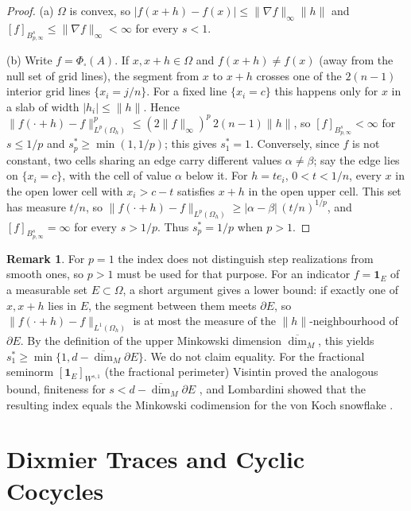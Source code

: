 \documentclass[11pt,a4paper,reqno]{amsart}
\theoremstyle{definition}
\newtheorem{remark}[theorem]{Remark}
\numberwithin{equation}{section}
\begin{document}
\begin{proof}
(a) $\Omega$ is convex, so $|f(x+h) - f(x)| \le \|\nabla f\|_\infty \|h\|$ and $[f]_{B^s_{p,\infty}} \le \|\nabla f\|_\infty < \infty$ for every $s < 1$.

(b) Write $f = \Phi_\square(A)$. If $x, x + h \in \Omega$ and $f(x+h) \ne f(x)$ (away from the null set of grid lines), the segment from $x$ to $x+h$ crosses one of the $2(n-1)$ interior grid lines $\{x_i = j/n\}$. For a fixed line $\{x_i = c\}$ this happens only for $x$ in a slab of width $|h_i| \le \|h\|$. Hence $\|f(\cdot + h) - f\|_{L^p(\Omega_h)}^p \le (2\|f\|_\infty)^p\, 2(n-1)\|h\|$, so $[f]_{B^s_{p,\infty}} < \infty$ for $s \le 1/p$ and $s^*_p \ge \min(1, 1/p)$; this gives $s^*_1 = 1$. Conversely, since $f$ is not constant, two cells sharing an edge carry different values $\alpha \ne \beta$; say the edge lies on $\{x_i = c\}$, with the cell of value $\alpha$ below it. For $h = t e_i$, $0 < t < 1/n$, every $x$ in the open lower cell with $x_i > c - t$ satisfies $x + h$ in the open upper cell. This set has measure $t/n$, so $\|f(\cdot+h) - f\|_{L^p(\Omega_h)} \ge |\alpha - \beta|\, (t/n)^{1/p}$, and $[f]_{B^s_{p,\infty}} = \infty$ for every $s > 1/p$. Thus $s^*_p = 1/p$ when $p > 1$.
\end{proof}

\begin{remark}
For $p = 1$ the index does not distinguish step realizations from smooth ones, so $p > 1$ must be used for that purpose. For an indicator $f = \mathbf{1}_E$ of a measurable set $E \subset \Omega$, a short argument gives a lower bound: if exactly one of $x, x+h$ lies in $E$, the segment between them meets $\partial E$, so $\|f(\cdot + h) - f\|_{L^1(\Omega_h)}$ is at most the measure of the $\|h\|$-neighbourhood of $\partial E$. By the definition of the upper Minkowski dimension $\overline{\dim}_M$, this yields $s^*_1 \ge \min\{1, d - \overline{\dim}_M \partial E\}$. We do not claim equality. For the fractional seminorm $[\mathbf{1}_E]_{W^{s,1}}$ (the fractional perimeter) Visintin proved the analogous bound, finiteness for $s < d - \overline{\dim}_M \partial E$ \cite{visintin1991generalized}, and Lombardini showed that the resulting index equals the Minkowski codimension for the von Koch snowflake \cite{lombardini2019fractional}.
\end{remark}

\section{Dixmier Traces and Cyclic Cocycles}
\label{sec:noncommutative}
\end{document}
